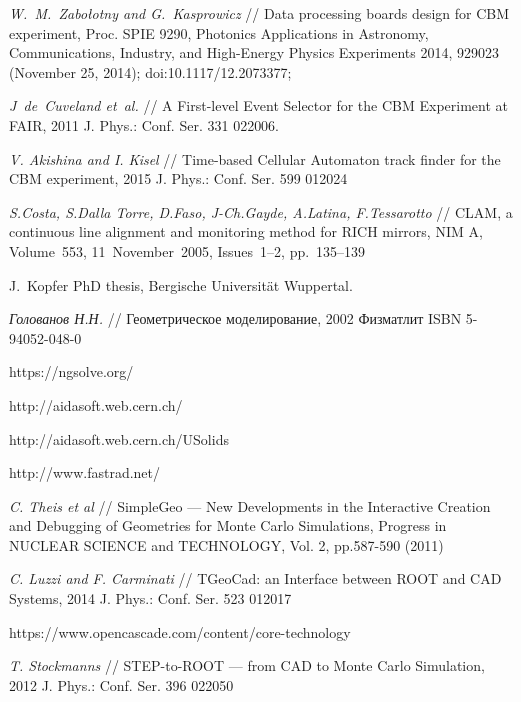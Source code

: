 \begin{thebibliography}{99}
\textit{W.~M.~Zabołotny and G.~Kasprowicz} //
Data processing boards design for CBM experiment,
Proc. SPIE 9290, Photonics Applications in Astronomy, Communications, Industry, and High-Energy Physics Experiments 2014, 929023 (November 25, 2014); doi:10.1117/12.2073377;

\textit{J~de~Cuveland et~al.} //
A First-level Event Selector for the CBM Experiment at FAIR,
2011 J. Phys.: Conf. Ser. 331 022006.

\textit{V. Akishina and I. Kisel} //
Time-based Cellular Automaton track finder for the CBM experiment,
2015 J. Phys.: Conf. Ser. 599 012024

\textit{S.Costa, S.Dalla Torre, D.Faso, J-Ch.Gayde, A.Latina, F.Tessarotto} //
CLAM, a continuous line alignment and monitoring method for RICH mirrors,
NIM A, Volume~553, 11~November~2005, Issues~1--2, pp.~135--139

J.~Kopfer PhD thesis, Bergische Universit\"{a}t Wuppertal.


\textit{Голованов Н.Н.} //
Геометрическое моделирование,
2002 Физматлит ISBN 5-94052-048-0

https://ngsolve.org/


http://aidasoft.web.cern.ch/

http://aidasoft.web.cern.ch/USolids

http://www.fastrad.net/

\textit{C. Theis et al} //
SimpleGeo --- New Developments in the Interactive Creation and Debugging of Geometries for Monte Carlo Simulations,
Progress in NUCLEAR SCIENCE and TECHNOLOGY, Vol. 2, pp.587-590 (2011)

\textit{C. Luzzi and F. Carminati} //
TGeoCad: an Interface between ROOT and CAD Systems,
2014 J. Phys.: Conf. Ser. 523 012017

https://www.opencascade.com/content/core-technology

\textit{T. Stockmanns} //
STEP-to-ROOT --- from CAD to Monte Carlo Simulation,
2012 J. Phys.: Conf. Ser. 396 022050


\end{thebibliography}

